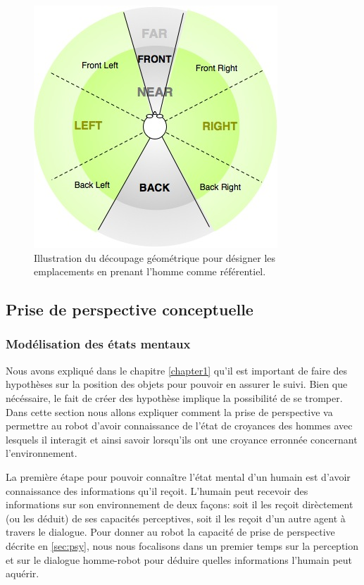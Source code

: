 \documentclass[a4paper,11pt,twoside]{StyleThese}
\begin{document}
\begin{figure}[ht!]
 \centering
  \includegraphics[width=0.59\linewidth]{./img/relative_position.jpg} 
  \caption {Illustration du découpage géométrique pour désigner les emplacements en prenant l'homme comme référentiel.}
  \label{fig:relativePose}
\end{figure}


\subsection{Prise de perspective conceptuelle}
\label{sec:beliefm}
\subsubsection{Modélisation des états mentaux}
Nous avons expliqué dans le chapitre \ref{chapter1} qu'il est important de faire des hypothèses sur la position des objets pour pouvoir en assurer le suivi. Bien que nécéssaire, le fait de créer des hypothèse implique la possibilité de se tromper.
Dans cette section nous allons expliquer comment la prise de perspective va permettre au robot d'avoir connaissance de l'état de croyances des hommes avec lesquels il interagit et ainsi savoir lorsqu'ils ont une croyance erronnée concernant l'environnement.

La première étape pour pouvoir connaître l'état mental d'un humain est d'avoir connaissance des informations qu'il reçoit. L'humain peut recevoir des informations sur son environnement de deux façons: soit il les reçoit dirèctement (ou les déduit) de ses capacités perceptives, soit il les reçoit d'un autre agent à travers le dialogue.
Pour donner au robot la capacité de prise de perspective décrite en \ref{sec:psy}, nous nous focalisons dans un premier temps sur la perception et sur le dialogue homme-robot pour déduire quelles informations l'humain peut aquérir.
\end{document}
